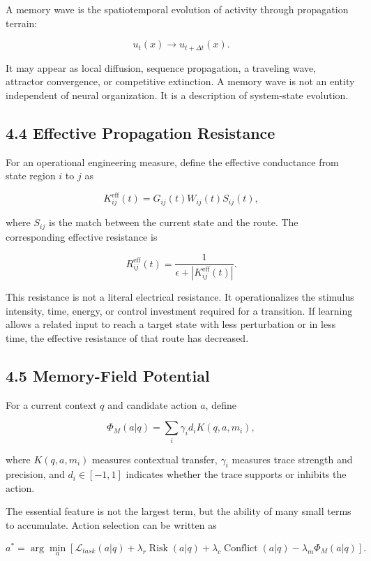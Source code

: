 \documentclass[11pt, a4paper]{article}
\begin{document}
A memory wave is the spatiotemporal evolution of activity through propagation terrain:

\[
u_t(x)\longrightarrow u_{t+\Delta t}(x).
\]

It may appear as local diffusion, sequence propagation, a traveling wave, attractor convergence, or competitive extinction. A memory wave is not an entity independent of neural organization. It is a description of system-state evolution.

\subsection{4.4 Effective Propagation Resistance}

For an operational engineering measure, define the effective conductance from state region $i$ to $j$ as

\[
K_{ij}^{\mathrm{eff}}(t)=G_{ij}(t)W_{ij}(t)S_{ij}(t),
\]

where $S_{ij}$ is the match between the current state and the route. The corresponding effective resistance is

\[
R_{ij}^{\mathrm{eff}}(t)=\frac{1}{\epsilon+\left|K_{ij}^{\mathrm{eff}}(t)\right|}.
\]

This resistance is not a literal electrical resistance. It operationalizes the stimulus intensity, time, energy, or control investment required for a transition. If learning allows a related input to reach a target state with less perturbation or in less time, the effective resistance of that route has decreased.

\subsection{4.5 Memory-Field Potential}

For a current context $q$ and candidate action $a$, define

\[
\Phi_M(a|q)=\sum_i\gamma_i d_i K(q,a,m_i),
\]

where $K(q,a,m_i)$ measures contextual transfer, $\gamma_i$ measures trace strength and precision, and $d_i\in[-1,1]$ indicates whether the trace supports or inhibits the action.

The essential feature is not the largest term, but the ability of many small terms to accumulate. Action selection can be written as

\[
a^\ast=\arg\min_a\left[\mathcal{L}_{task}(a|q)+\lambda_r\operatorname{Risk}(a|q)+\lambda_c\operatorname{Conflict}(a|q)-\lambda_m\Phi_M(a|q)\right].
\]
\end{document}
